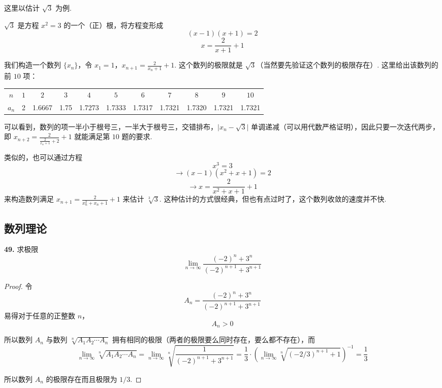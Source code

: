 这里以估计 $\sqrt{3}$ 为例.

$\sqrt{3}$ 是方程 $x^2 = 3$ 的一个（正）根，将方程变形成
\[(x-1)(x+1) = 2\]
\[x = \frac{2}{x+1}+1\]

我们构造一个数列 $\{x_n\}$，令 $x_1 = 1$，$\displaystyle x_{n+1} = \frac{2}{x_n+1}+1$. 这个数列的极限就是 $\sqrt{3}$（当然要先验证这个数列的极限存在）. 这里给出该数列的前 $10$ 项：

\begin{center}
    \begin{tabular}{c|cccccccccc}
        \hline
        $n$ & $1$ & $2$ & $3$ & $4$ & $5$ & $6$ & $7$ & $8$ & $9$ & $10$\\
        $a_n$ & 2 & 1.6667 & 1.75 & 1.7273 & 1.7333 & 1.7317 & 1.7321 & 1.7320 & 1.7321 & 1.7321\\
        \hline
    \end{tabular}
\end{center}

可以看到，数列的项一半小于根号三，一半大于根号三，交错排布，$\lvert x_n - \sqrt{3}\rvert$ 单调递减（可以用代数严格证明），因此只要一次迭代两步，即 $\displaystyle x_{n+2} = \frac{2}{\frac{2}{x_n+1}+2}+1$ 就能满足第 $10$ 题的要求.

类似的，也可以通过方程
\[x^3 = 3\]
\[\rightarrow (x-1)(x^2+x+1) = 2\]
\[\rightarrow x = \frac{2}{x^2+x+1}+1\]
来构造数列满足 $\displaystyle x_{n+1} = \frac{2}{x_n^2+x_n+1}+1$ 来估计 $\sqrt[3]{3}$. 这种估计的方式很经典，但也有点过时了，这个数列收敛的速度并不快.

\subsection{数列理论}
\textbf{49.} 求极限
\[\lim_{n \rightarrow \infty} \frac{(-2)^n + 3^n}{(-2)^{n+1} + 3^{n+1}} \tag{49.1}\]
\begin{proof}
    令
    \[A_n = \frac{(-2)^n + 3^n}{(-2)^{n+1} + 3^{n+1}} \tag{49.2}\]
    易得对于任意的正整数 $n$，
    \[A_n > 0\]

    所以数列 $A_n$ 与数列 $\sqrt[n]{A_1A_2 \cdots A_n}$ 拥有相同的极限（两者的极限要么同时存在，要么都不存在），而
    \[\lim_{n \rightarrow \infty} \sqrt[n]{A_1 A_2 \cdots A_n} = \lim_{n \rightarrow \infty} \sqrt[n]{\frac{1}{(-2)^{n+1} + 3^{n+1}}} = \frac{1}{3} \cdot \left(\lim_{n \rightarrow \infty} \sqrt[n]{(-2/3)^{n+1} + 1}\right)^{-1} = \frac{1}{3} \tag{49.3}\]

    所以数列 $A_n$ 的极限存在而且极限为 $1/3$.
\end{proof}\vspace{9pt}

